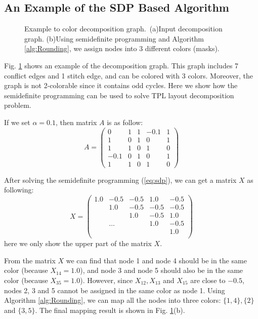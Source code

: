 \documentclass[10pt,conference]{IEEEtran}
\begin{document}
\subsection{An Example of the SDP Based Algorithm}

\begin{figure}[tb]
	\centering
	\caption{Example to color decomposition graph.~(a)Input decomposition graph.
	(b)Using semidefinite programming and Algorithm \ref{alg:Rounding}, we assign nodes into 3 different colors (masks).}
\label{fig:example}
\end{figure}

Fig. \ref{fig:example} shows an example of the decomposition graph.
This graph includes 7 conflict edges and 1 stitch edge, and can be colored with 3 colors.
Moreover, the graph is not 2-colorable since it contains odd cycles.
Here we show how the semidefinite programming can be used to solve TPL layout decomposition problem.

If we set $\alpha = 0.1$, then matrix $A$ is as follow:
\begin{displaymath}
	A = 
	\left(
		\begin{array}{ccccc}
			0 	& 1 	& 1 	& -0.1 	& 1\\
			1 	& 0 	& 1 	& 0 		& 1\\
			1	& 1 	& 0 	& 1 		& 0\\
			-0.1 & 0 	& 1 	& 0 		& 1\\
			1 	& 1 	& 0 	& 1 		& 0
		\end{array}
	\right)
\end{displaymath}

After solving the semidefinite programming (\ref{eq:sdp}), we can get a matrix $X$ as following:
\begin{displaymath}
	X =
	\left(
		\begin{array}{ccccc}
			1.0	& -0.5	& -0.5	& 1.0	& -0.5\\
				& 1.0	& -0.5	& -0.5	& -0.5\\
				&		& 1.0	& -0.5	& 1.0\\
				& \ldots&		& 1.0	& -0.5\\
				&		&		&		& 1.0\\
		\end{array}
	\right)
\end{displaymath}
here we only show the upper part of the matrix $X$.

From the matrix $X$ we can find that node 1 and node 4 should be in the same color (because $X_{14}=1.0$), and node 3 and node 5 should also be in the same color (because $X_{35}=1.0$).
However, since $X_{12}, X_{13}$ and $X_{15}$ are close to $-0.5$, nodes 2, 3 and 5 cannot be assigned in the same color as node 1.
Using Algorithm \ref{alg:Rounding}, we can map all the nodes into three colors: $\{1,4\}, \{2\}$ and $\{3, 5\}$.
The final mapping result is shown in Fig. \ref{fig:example}(b).
\end{document}
